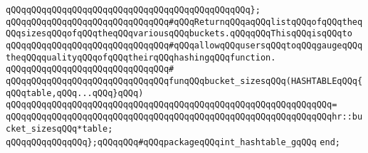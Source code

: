 \verb|qQQqqQQqqQQqqQQqqQQqqQQqqQQqqQQqqQQqqQQqqQQqqQQq};|\newline
\newline
\verb|qQQqqQQqqQQqqQQqqQQqqQQqqQQqqQQq#qQQqReturnqQQqaqQQqlistqQQqofqQQqtheqQQqsizesqQQqofqQQqtheqQQqvariousqQQqbuckets.qQQqqQQqThisqQQqisqQQqto|\newline
\verb|qQQqqQQqqQQqqQQqqQQqqQQqqQQqqQQq#qQQqallowqQQqusersqQQqtoqQQqgaugeqQQqtheqQQqqualityqQQqofqQQqtheirqQQqhashingqQQqfunction.|\newline
\verb|qQQqqQQqqQQqqQQqqQQqqQQqqQQqqQQq#|\newline
\verb|qQQqqQQqqQQqqQQqqQQqqQQqqQQqqQQqfunqQQqbucket_sizesqQQq(HASHTABLEqQQq{qQQqtable,qQQq...qQQq}qQQq)|\newline
\verb|qQQqqQQqqQQqqQQqqQQqqQQqqQQqqQQqqQQqqQQqqQQqqQQqqQQqqQQqqQQqqQQq=|\newline
\verb|qQQqqQQqqQQqqQQqqQQqqQQqqQQqqQQqqQQqqQQqqQQqqQQqqQQqqQQqqQQqqQQqhr::bucket_sizesqQQq*table;|\newline
\newline
\verb|qQQqqQQqqQQqqQQq};qQQqqQQq#qQQqpackageqQQqint_hashtable_gqQQq|\newline
\verb|end;|\newline
\newline
\newline
\newline

